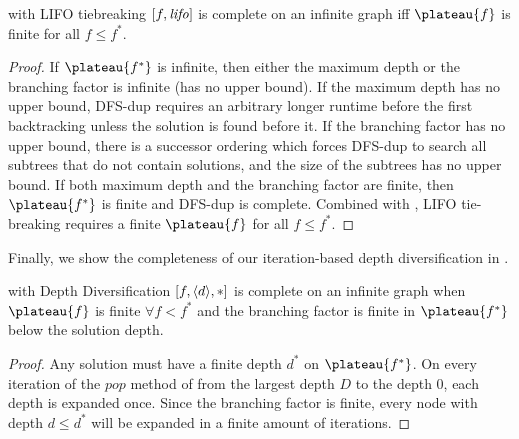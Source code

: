 \begin{propo} %
 \astar with LIFO tiebreaking $[f,{\text{\textit{lifo}}}]$ is complete on an infinite graph iff
 $\plateau{f}$ is finite for all $f\leq f^*$.
\end{propo}

\begin{proof}
 If $\plateau{f^*}$ is infinite, then
 either the maximum depth or the branching factor is infinite (has no upper bound).
 If the maximum depth has no upper bound,
 DFS-dup requires an arbitrary longer runtime before the first backtracking
 unless the solution is found before it.
 If the branching factor has no upper bound,
 there is a successor ordering which forces DFS-dup
 to search all subtrees that do not contain solutions, and
 the size of the subtrees has no upper bound.
 If both maximum depth and the branching factor are finite, then $\plateau{f^*}$ is finite
 and DFS-dup is complete.
 Combined with ,
 LIFO tie-breaking requires a finite $\plateau{f}$ for all $f\leq f^*$.
\end{proof}

Finally, we show the completeness of our iteration-based depth diversification in .

\begin{theo}
 \astar with Depth Diversification $[f,{\left<d\right>},*]$ is complete on an infinite graph when
 $\plateau{f}$ is finite  $\forall f<f^*$ and
 the branching factor is finite in $\plateau{f^*}$ below the solution depth.
\end{theo}
 
\begin{proof}
 Any solution must have a finite depth $d^*$ on $\plateau{f^*}$.
 On every iteration of the $pop$ method of  from the largest depth $D$ to the depth 0, each depth is expanded once.
 Since the branching factor is finite,
 every node with depth $d\leq d^*$ will be expanded in a finite amount of iterations.
\end{proof}


